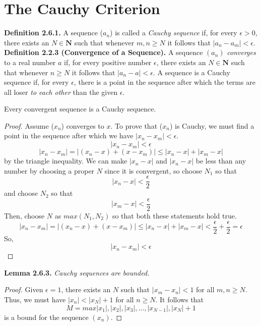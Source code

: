 \section{The Cauchy Criterion}
    \textbf{Definition 2.6.1.} A sequence ($a_n$) is called a \textit{Cauchy sequence} if, for every $\epsilon > 0$, there exists an $N \in \textbf{N}$ such that whenever $m, n \geq N$ it follows that $|a_n - a_m| < \epsilon$.
    \newline
    \textbf{Definition 2.2.3 (Convergence of a Sequence).} A sequence $(a_n)$ \textit{converges} to a real number $a$ if, for every positive number $\epsilon$, there exists an $N \in \textbf{N}$ such that whenever $n \geq N$ it follows that $|a_n - a| < \epsilon$.
    \newline
    A sequence is a Cauchy sequence if, for every $\epsilon$, there is a point in the sequence after which the terms are all loser \textit{to each other} than the given $\epsilon$. 
    \setcounter{theorem}{1}
    \begin{theorem}
        Every convergent sequence is a Cauchy sequence.
    \end{theorem}
    \begin{proof}
        Assume ($x_n$) converges to $x$. To prove that ($x_n$) is Cauchy, we must find a point in the sequence after which we have $|x_n - x_m| < \epsilon$. 
        $$|x_n - x_m| < \epsilon$$
        $$|x_n - x_m| = |(x_n - x) + (x - x_m)| \leq |x_n - x| + |x_m - x|$$
        by the triangle inequality. We can make $|x_n - x|$ and $|x_n - x|$ be less than any number by choosing a proper $N$ since it is convergent, so choose $N_1$ so that
        $$|x_n - x| < \frac{\epsilon}{2}$$
        and choose $N_2$ so that
        $$|x_m - x| < \frac{\epsilon}{2}$$
        Then, choose $N$ as $max(N_1, N_2)$ so that both these statements hold true.
        $$|x_n - x_m| = |(x_n - x) + (x - x_m)| \leq |x_n - x| + |x_m - x| < \frac{\epsilon}{2} + \frac{\epsilon}{2} = \epsilon$$
        So,
        $$|x_n - x_m| < \epsilon$$
    \end{proof}
    \textbf{Lemma 2.6.3.} \textit{Cauchy sequences are bounded.}
    \begin{proof}
        Given $\epsilon = 1$, there exists an $N$ such that $|x_m - x_n| < 1$ for all $m, n \geq N$. Thus, we must have $|x_n| < |x_N| + 1$ for all $n \geq N$. It follows that 
        $$M = max{|x_1|,|x_2|,|x_3|,\dots,|x_{N-1}|,|x_N| + 1}$$
        is a bound for the sequence $(x_n)$.
    \end{proof}
    \setcounter{theorem}{3}
